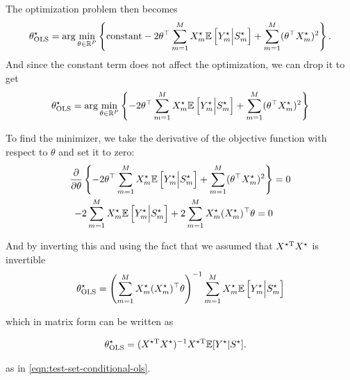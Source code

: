 The optimization problem then becomes
\begin{align}
    \theta^{\star}_{\text{OLS}} = \arg\min_{\theta \in \mathbb{R}^P} \left\{ \text{constant} -2 \theta^{\top} \sum_{m=1}^M X^{\star}_m \mathbb{E}\left[Y^{\star}_m  \Big| S^{\star}_m\right]  + \sum_{m=1}^M (\theta^{\top} X^{\star}_m)^2 \right\}.
\end{align}
And since the constant term does not affect the optimization, we can drop it to get 
\begin{align}
    \theta^{\star}_{\text{OLS}} = \arg\min_{\theta \in \mathbb{R}^P} \left\{-2 \theta^{\top} \sum_{m=1}^M X^{\star}_m \mathbb{E}\left[Y^{\star}_m  \Big| S^{\star}_m\right]  + \sum_{m=1}^M (\theta^{\top} X^{\star}_m)^2 \right\}
\end{align}

To find the minimizer, we take the derivative of the objective function with respect to $\theta$ and set it to zero:
\begin{align}
    \frac{\partial}{\partial \theta} \left\{-2 \theta^{\top} \sum_{m=1}^M X^{\star}_m \mathbb{E}\left[Y^{\star}_m  \Big| S^{\star}_m\right]  + \sum_{m=1}^M (\theta^{\top} X^{\star}_m)^2 \right\} &= 0 \\
    -2 \sum_{m=1}^M X^{\star}_m \mathbb{E}\left[Y^{\star}_m  \Big| S^{\star}_m\right]  + 2 \sum_{m=1}^M X^{\star}_m (X^{\star}_m)^{\top}  \theta = 0
\end{align}

And by inverting this and using the fact that we assumed that $X^{\star\mathrm{T}}X^{\star}$ is invertible 
\begin{align}
    \theta^{\star}_{\text{OLS}} = \left( \sum_{m=1}^M X^{\star}_m (X^{\star}_m)^{\top}  \theta \right)^{-1} \sum_{m=1}^M X^{\star}_m \mathbb{E}\left[Y^{\star}_m  \Big| S^{\star}_m\right]
\end{align}

which in matrix form can be written as 

\begin{align}
\theta^{\star}_{\text{OLS}} &= (X^{\star\mathrm{T}}X^{\star})^{-1}X^{\star\mathrm{T}}\mathbb{E}[Y^{\star}|S^{\star}].
\end{align}

as in \cref{eqn:test-set-conditional-ols}.

